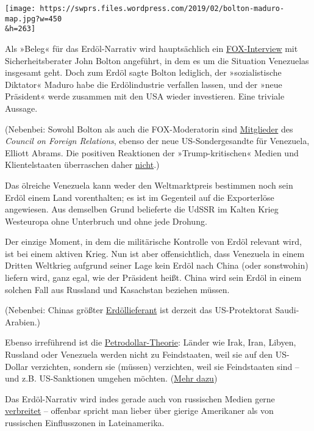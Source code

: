 \texttt{[image: https://swprs.files.wordpress.com/2019/02/bolton-maduro-map.jpg?w=450\\\&h=263]}

Als »Beleg« für das Erdöl-Narrativ wird hauptsächlich ein
\href{https://www.youtube.com/watch?v=8av-cPP1uPE}{FOX-Interview} mit
Sicherheitsberater John Bolton angeführt, in dem es um die Situation
Venezuelas insgesamt geht. Doch zum Erdöl sagte Bolton lediglich, der
»sozialistische Diktator« Maduro habe die Erdölindustrie verfallen
lassen, und der »neue Präsident« werde zusammen mit den USA wieder
investieren. Eine triviale Aussage.

(Nebenbei: Sowohl Bolton als auch die FOX-Moderatorin sind
\href{https://swprs.org/das-american-empire-und-seine-medien/}{Mitglieder}
des \emph{Council on Foreign Relations}, ebenso der neue
US-Sondergesandte für Venezuela, Elliott Abrams. Die positiven
Reaktionen der »Trump-kritischen« Medien und Klientelstaaten überraschen
daher \href{https://swprs.org/trump-medien-geopolitik/}{nicht}.)

Das ölreiche Venezuela kann weder den Weltmarktpreis bestimmen noch sein
Erdöl einem Land vorenthalten; es ist im Gegenteil auf die Exporterlöse
angewiesen. Aus demselben Grund belieferte die UdSSR im Kalten Krieg
Westeuropa ohne Unterbruch und ohne jede Drohung.

Der einzige Moment, in dem die militärische Kontrolle von Erdöl relevant
wird, ist bei einem aktiven Krieg. Nun ist aber offensichtlich, dass
Venezuela in einem Dritten Weltkrieg aufgrund seiner Lage kein Erdöl
nach China (oder sonstwohin) liefern wird, ganz egal, wie der Präsident
heißt. China wird sein Erdöl in einem solchen Fall aus Russland und
Kasachstan beziehen müssen.

(Nebenbei: Chinas größter
\href{https://oilprice.com/Energy/Crude-Oil/The-Battle-For-Chinas-Oil-Market.html}{Erdöllieferant}
ist derzeit das US-Protektorat Saudi-Arabien.)

Ebenso irreführend ist die
\href{https://foreignpolicy.com/2009/10/07/debunking-the-dumping-the-dollar-conspiracy/}{Petrodollar-Theorie}:
Länder wie Irak, Iran, Libyen, Russland oder Venezuela werden nicht zu
Feindstaaten, weil sie auf den US-Dollar verzichten, sondern sie
(müssen) verzichten, weil sie Feindstaaten sind -- und z.B.
US-Sanktionen umgehen möchten.
(\href{https://www.nachdenkseiten.de/?p=44020}{Mehr dazu})

Das Erdöl-Narrativ wird indes gerade auch von russischen Medien gerne
\href{https://www.rt.com/usa/449982-john-bolton-oil-venezuela/}{verbreitet}
-- offenbar spricht man lieber über gierige Amerikaner als von
russischen Einflusszonen in Lateinamerika.

